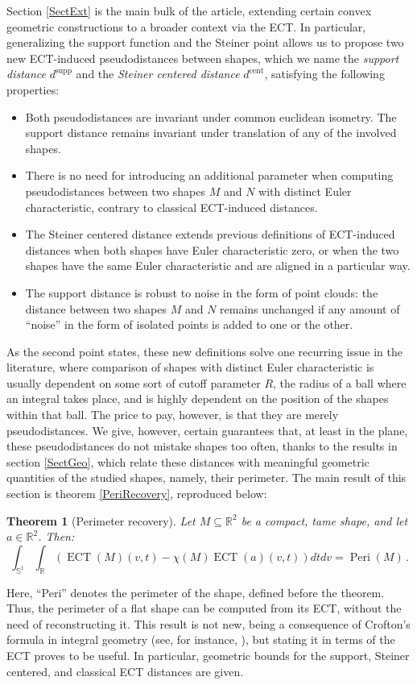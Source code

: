 \documentclass[a4paper]{article}
\newtheorem{theorem}{Theorem}[section]
\newcommand{\ECT}{\operatorname{ECT}}
\newcommand{\bb}{\mathbb}
\newcommand{\Peri}{\operatorname{Peri}}
\newcommand{\dsupp}{d^{\operatorname{supp}}}
\newcommand{\dcent}{d^{\operatorname{cent}}}
\begin{document}
Section \ref{SectExt} is the main bulk of the article, extending certain convex geometric constructions to a broader context via the ECT. In particular, generalizing the support function and the Steiner point allows us to propose two new ECT-induced pseudodistances between shapes, which we name the \emph{support distance} $\dsupp$ and the \emph{Steiner centered distance} $\dcent$, satisfying the following properties:
\begin{itemize}
	\item Both pseudodistances are invariant under common euclidean isometry. The support distance remains invariant under translation of any of the involved shapes.
	\item There is no need for introducing an additional parameter when computing pseudodistances between two shapes $M$ and $N$ with distinct Euler characteristic, contrary to classical ECT-induced distances.
	\item The Steiner centered distance extends previous definitions of ECT-induced distances when both shapes have Euler characteristic zero, or when the two shapes have the same Euler characteristic and are aligned in a particular way.
	\item The support distance is robust to noise in the form of point clouds: the distance between two shapes $M$ and $N$ remains unchanged if any amount of ``noise'' in the form of isolated points is added to one or the other.
\end{itemize}
As the second point states, these new definitions solve one recurring issue in the literature, where comparison of shapes with distinct Euler characteristic is usually dependent on some sort of cutoff parameter $R$, the radius of a ball where an integral takes place, and is highly dependent on the position of the shapes within that ball. The price to pay, however, is that they are merely pseudodistances. We give, however, certain guarantees that, at least in the plane, these pseudodistances do not mistake shapes too often, thanks to the results in section \ref{SectGeo}, which relate these distances with meaningful geometric quantities of the studied shapes, namely, their perimeter. The main result of this section is theorem \ref{PeriRecovery}, reproduced below:
\begin{theorem}[Perimeter recovery]
	Let $M \subseteq \bb R^2$ be a compact, tame shape, and let $a \in \bb R^2$. Then:
	\[ \int_{\bb S^1} \int_{\bb R} (\ECT(M)(v,t)- \chi(M) \ECT(a)(v,t)) dt dv=\Peri(M)\, .\]
\end{theorem}
Here, ``Peri'' denotes the perimeter of the shape, defined before the theorem. Thus, the perimeter of a flat shape can be computed from its ECT, without the need of reconstructing it. This result is not new, being a consequence of Crofton's formula in integral geometry (see, for instance, \cite{hug_integral_2020}), but stating it in terms of the ECT proves to be useful. In particular, geometric bounds for the support, Steiner centered, and classical ECT distances are given.
\end{document}
